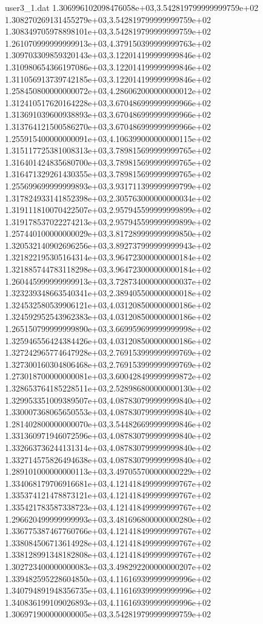 \begin{filecontents}{user3_1.dat}
1.306996102098476058e+03,3.542819799999999759e+02
1.308270269131455279e+03,3.542819799999999759e+02
1.308349705978898101e+03,3.542819799999999759e+02
1.261070999999999913e+03,4.379150399999999763e+02
1.309703309859320143e+03,3.122014199999999846e+02
1.310980654366197086e+03,3.122014199999999846e+02
1.311056913739742185e+03,3.122014199999999846e+02
1.258450800000000072e+03,4.286062000000000012e+02
1.312410517620164228e+03,3.670486999999999966e+02
1.313691039600938893e+03,3.670486999999999966e+02
1.313764121500586270e+03,3.670486999999999966e+02
1.255915400000000091e+03,4.106399000000000115e+02
1.315117725381008313e+03,3.789815699999999765e+02
1.316401424835680700e+03,3.789815699999999765e+02
1.316471329261430355e+03,3.789815699999999765e+02
1.255699699999999893e+03,3.931711399999999799e+02
1.317824933141852398e+03,2.305763000000000034e+02
1.319111810070422507e+03,2.957945599999999899e+02
1.319178537022274213e+03,2.957945599999999899e+02
1.257440100000000029e+03,3.817289999999999850e+02
1.320532140902696256e+03,3.892737999999999943e+02
1.321822195305164314e+03,3.964723000000000184e+02
1.321885744783118298e+03,3.964723000000000184e+02
1.260445999999999913e+03,3.728734000000000037e+02
1.323239348663540341e+03,2.389405500000000018e+02
1.324532580539906121e+03,4.031208500000000186e+02
1.324592952543962383e+03,4.031208500000000186e+02
1.265150799999999890e+03,3.669959699999999998e+02
1.325946556424384426e+03,4.031208500000000186e+02
1.327242965774647928e+03,2.769153999999999769e+02
1.327300160304806468e+03,2.769153999999999769e+02
1.273018700000000081e+03,3.600428499999999872e+02
1.328653764185228511e+03,2.528986800000000130e+02
1.329953351009389507e+03,4.087830799999999840e+02
1.330007368065650553e+03,4.087830799999999840e+02
1.281402800000000070e+03,3.544826699999999846e+02
1.331360971946072596e+03,4.087830799999999840e+02
1.332663736244131314e+03,4.087830799999999840e+02
1.332714575826494638e+03,4.087830799999999840e+02
1.289101000000000113e+03,3.497055700000000229e+02
1.334068179706916681e+03,4.121418499999999767e+02
1.335374121478873121e+03,4.121418499999999767e+02
1.335421783587338723e+03,4.121418499999999767e+02
1.296620499999999993e+03,3.481696800000000280e+02
1.336775387467760766e+03,4.121418499999999767e+02
1.338084506713614928e+03,4.121418499999999767e+02
1.338128991348182808e+03,4.121418499999999767e+02
1.302723400000000083e+03,3.498292200000000207e+02
1.339482595228604850e+03,4.116169399999999996e+02
1.340794891948356735e+03,4.116169399999999996e+02
1.340836199109026893e+03,4.116169399999999996e+02
1.306971900000000005e+03,3.542819799999999759e+02

\end{filecontents}
